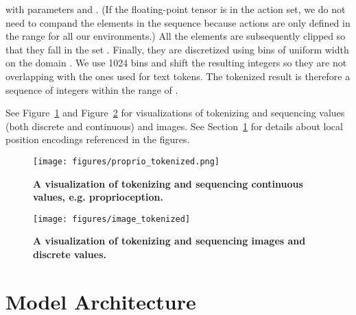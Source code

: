 \documentclass[10pt]{article} \usepackage[accepted]{tmlr}
\begin{document}
with parameters  and .
(If the floating-point tensor is in the action set, we do not need to compand the elements in the sequence because actions are only defined in the range  for all our environments.)
All the elements are subsequently clipped so that they fall in the set . Finally, they are discretized using bins of uniform width on the domain . We use 1024 bins and shift the resulting integers so they are not overlapping with the ones used for text tokens. The tokenized result is therefore a sequence of integers within the range of .


See Figure~\ref{fig:proprio_tokenization} and Figure~\ref{fig:image_tokenization} for visualizations of tokenizing and sequencing values (both discrete and continuous) and images.
See Section~\ref{app:model_arch} for details about local position encodings referenced in the figures.

\begin{figure}
    \centering
    \texttt{[image: figures/proprio\_tokenized.png]} \caption{{\bf A visualization of tokenizing and sequencing continuous values, e.g. proprioception.}
    \label{fig:proprio_tokenization}}
\end{figure}

\begin{figure}
    \centering
    \texttt{[image: figures/image\_tokenized]} \caption{{\bf A visualization of tokenizing and sequencing images and discrete values.}
    \label{fig:image_tokenization}}
\end{figure}

\newpage
\section{Model Architecture}
\label{app:model_arch}
\end{document}
